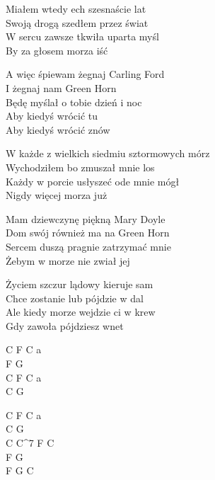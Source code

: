\begin{text}
   
    Miałem wtedy ech szesnaście lat\\
    Swoją drogą szedłem przez świat \\
    W sercu zawsze tkwiła uparta myśl \\
    By za głosem morza iść
	
    \vin A więc śpiewam żegnaj Carling Ford \\
    \vin I żegnaj nam Green Horn \\
    \vin Będę myślał o tobie dzień i noc \\
    \vin Aby kiedyś wrócić tu \\
    \vin Aby kiedyś wrócić znów 

    W każde z wielkich siedmiu sztormowych mórz\\
    Wychodziłem bo zmuszał mnie los\\
    Każdy w porcie usłyszeć ode mnie mógł\\
    Nigdy więcej morza już
	
    Mam dziewczynę piękną Mary Doyle\\
    Dom swój również ma na Green Horn\\
    Sercem duszą pragnie zatrzymać mnie\\
    Żebym w morze nie zwiał jej
	
    Życiem szczur lądowy kieruje sam\\
    Chce zostanie lub pójdzie w dal\\
    Ale kiedy morze wejdzie ci w krew\\
    Gdy zawoła pójdziesz wnet   

\end{text}
\begin{chord}
    C F C a\\
    F G\\
    C F C a\\
    C G
	
    C F C a\\
    C G \\
    C C^7 F C\\
    F G \\
    F G C 
\end{chord}
